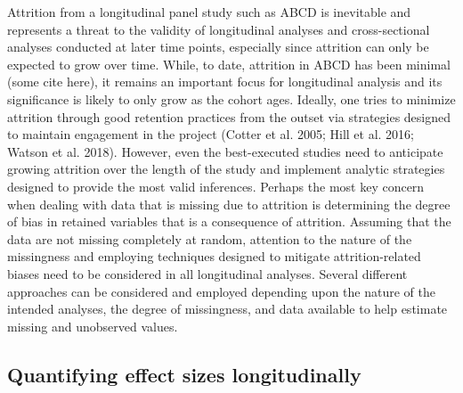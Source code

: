 \documentclass[
  letterpaper,
  DIV=11,
  numbers=noendperiod]{scrartcl}
\begin{document}
Attrition from a longitudinal panel study such as ABCD is inevitable and
represents a threat to the validity of longitudinal analyses and
cross-sectional analyses conducted at later time points, especially
since attrition can only be expected to grow over time. While, to date,
attrition in ABCD has been minimal (some cite here), it remains an
important focus for longitudinal analysis and its significance is likely
to only grow as the cohort ages. Ideally, one tries to minimize
attrition through good retention practices from the outset via
strategies designed to maintain engagement in the project (Cotter et al.
2005; Hill et al. 2016; Watson et al. 2018). However, even the
best-executed studies need to anticipate growing attrition over the
length of the study and implement analytic strategies designed to
provide the most valid inferences. Perhaps the most key concern when
dealing with data that is missing due to attrition is determining the
degree of bias in retained variables that is a consequence of attrition.
Assuming that the data are not missing completely at random, attention
to the nature of the missingness and employing techniques designed to
mitigate attrition-related biases need to be considered in all
longitudinal analyses. Several different approaches can be considered
and employed depending upon the nature of the intended analyses, the
degree of missingness, and data available to help estimate missing and
unobserved values.

\hypertarget{quantifying-effect-sizes-longitudinally}{%
\subsection{Quantifying effect sizes
longitudinally}\label{quantifying-effect-sizes-longitudinally}}
\end{document}
